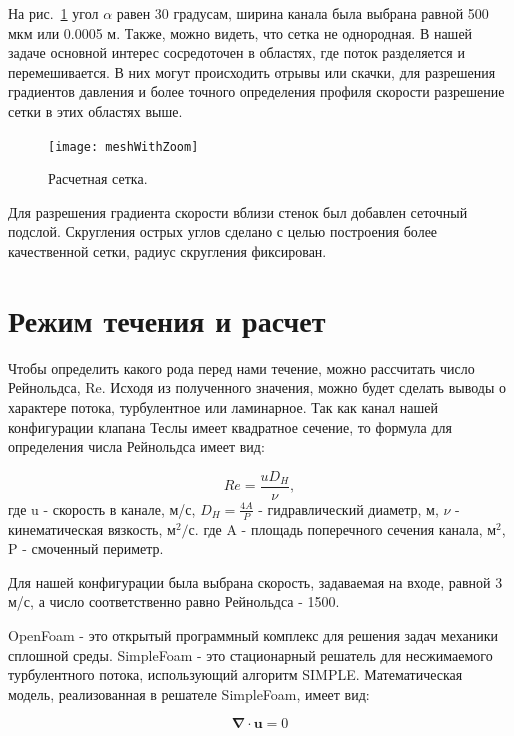 \documentclass[10pt,a4paper]{book}
\begin{document}
    На рис.~\ref{fig:teslaMesh2} угол $\alpha$ равен 30 градусам, ширина канала была выбрана равной 500 мкм или 0.0005 м. Также, можно видеть, что сетка не однородная. В нашей задаче основной интерес сосредоточен в областях, где поток разделяется и перемешивается. В них могут происходить отрывы или скачки, для разрешения градиентов давления и более точного определения профиля скорости разрешение сетки в этих областях выше.
    
    \begin{figure}[H]
        \centering
        \texttt{[image: meshWithZoom]}
        \caption{Расчетная сетка.}
        \label{fig:teslaMesh2}
    \end{figure}   
    
    Для разрешения градиента скорости вблизи стенок был добавлен сеточный подслой. Скругления острых углов сделано с целью построения более качественной сетки, радиус скругления фиксирован.
    
    \section{Режим течения и расчет}        
    
    Чтобы определить какого рода перед нами течение, можно рассчитать число Рейнольдса, Re. Исходя из полученного значения, можно будет сделать выводы о характере потока, турбулентное или ламинарное.
    Так как канал нашей конфигурации клапана Теслы имеет квадратное сечение, то формула для определения числа Рейнольдса имеет вид:
    
    \begin{equation}\label{eqn:Re}
        Re = \frac{u D_{H}}{\nu},
    \end{equation}            
    где  u - скорость в канале, м/с, $ D_{H} = \frac{4A}{P} $ - гидравлический диаметр, м, $\nu$ - кинематическая вязкость, м$^{2}/$с. 
    где A - площадь поперечного сечения канала, м$^{2}$, P - смоченный периметр. 
    
    Для нашей конфигурации была выбрана скорость, задаваемая на входе, равной 3 м/с, а число соответственно равно Рейнольдса - 1500.
    
    OpenFoam - это открытый программный комплекс для решения задач механики сплошной среды. SimpleFoam - это стационарный решатель для несжимаемого турбулентного потока, использующий алгоритм SIMPLE. Математическая модель, реализованная в решателе SimpleFoam, имеет вид:
    
    \begin{equation}\label{eqn:simpleFoam}
        \bm{\nabla} \cdot \bm{u} = 0
    \end{equation} 
    
\end{document}
